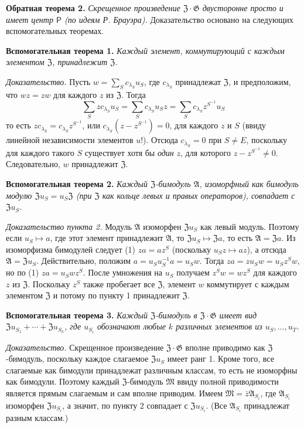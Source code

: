 \documentclass[11pt]{article}
\begin{document}
\noindent\textbf{Обратная теорема 2.} \emph{Скрещенное произведение \(\mathfrak Z\cdot\mathfrak G\) двусторонне просто и имеет центр \(\mathsf{P}\) (по идеям Р. Брауэра).} Доказательство основано на следующих вспомогательных теоремах.

\noindent\textbf{Вспомогательная теорема 1.} \emph{Каждый элемент, коммутирующий с каждым элементом \(\mathfrak Z\), принадлежит \(\mathfrak Z\).}

\noindent\emph{Доказательство.} Пусть \(w=\sum_S c_{\lambda_S}u_S\), где \(c_{\lambda_S}\) принадлежат \(\mathfrak Z\), и предположим, что \(wz=zw\) для каждого \(z\) из \(\mathfrak Z\). Тогда
\[
\sum_S zc_{\lambda_S}u_S
 =\sum_S c_{\lambda_S}u_Sz
 =\sum_S c_{\lambda_S}z^{S^{-1}}u_S
\]
то есть \(zc_{\lambda_S}=c_{\lambda_S}z^{S^{-1}}\), или \(c_{\lambda_S}(z-z^{S^{-1}})=0\), для каждого \(z\) и \(S\) (ввиду линейной независимости элементов \(u\)!). Отсюда \(c_{\lambda_S}=0\) при \(S\neq E\), поскольку для каждого такого \(S\) существует хотя бы \emph{один} \(z\), для которого \(z-z^{S^{-1}}\neq0\). Следовательно, \(w\) принадлежит \(\mathfrak Z\).

\noindent\textbf{Вспомогательная теорема 2.} \emph{Каждый \(\mathfrak Z\)-бимодуль \(\mathfrak A\), изоморфный как бимодуль модулю \(\mathfrak Zu_S=u_S\mathfrak Z\) (при \(\mathfrak Z\) как кольце левых и правых операторов), совпадает с \(\mathfrak Zu_S\).}

\noindent\emph{Доказательство пункта 2.} Модуль \(\mathfrak A\) изоморфен \(\mathfrak Zu_S\) как левый модуль. Поэтому если \(u_S\mapsto a\), где этот элемент принадлежит \(\mathfrak A\), то \(\mathfrak Zu_S\mapsto\mathfrak Za\), то есть \(\mathfrak A=\mathfrak Za\). Из изоморфизма бимодулей следует (1) \(za=az^S\) (поскольку \(u_Sz\mapsto az\)), а отсюда \(\mathfrak A=\mathfrak Zu_S\). Действительно, положим \(a=u_Su_S^{-1}a=u_Sw\). Тогда \(za=zu_Sw=u_Sz^Sw\), но по (1) \(za=u_Swz^S\). После умножения на \(u_S\) получаем \(z^Sw=wz^S\) для каждого \(z\) из \(\mathfrak Z\). Поскольку \(z^S\) также пробегает все \(\mathfrak Z\), элемент \(w\) коммутирует с каждым элементом \(\mathfrak Z\) и потому по пункту 1 принадлежит \(\mathfrak Z\).

\noindent\textbf{Вспомогательная теорема 3.} \emph{Каждый \(\mathfrak Z\)-бимодуль в \(\mathfrak Z\cdot\mathfrak G\) имеет вид \(\mathfrak Zu_{S_1}+\cdots+\mathfrak Zu_{S_k}\), где \(u_{S_i}\) обозначают любые \(k\) различных элементов из \(u_S,\ldots,u_T\).}

\noindent\emph{Доказательство.} Скрещенное произведение \(\mathfrak Z\cdot\mathfrak G\) вполне приводимо как \(\mathfrak Z\)-бимодуль, поскольку каждое слагаемое \(\mathfrak Zu_S\) имеет ранг 1. Кроме того, все слагаемые как бимодули принадлежат различным классам, то есть не изоморфны как бимодули. Поэтому каждый \(\mathfrak Z\)-бимодуль \(\mathfrak M\) ввиду полной приводимости является прямым слагаемым и сам вполне приводим. Имеем \(\mathfrak M=\bar z\mathfrak A_{S_i}\), где \(\mathfrak A_{S_i}\) изоморфен \(\mathfrak Zu_{S_i}\), а значит, по пункту 2 совпадает с \(\mathfrak Zu_{S_i}\). (Все \(\mathfrak A_{S_i}\) принадлежат разным классам.)
\end{document}
